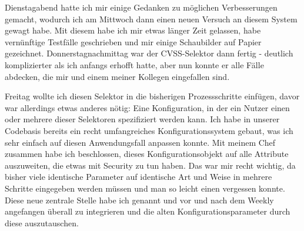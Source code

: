\sweekdaymarginpar{\weekdayWednesdayShort, \weekdayThursdayShort}

Dienstagabend hatte ich mir einige Gedanken zu möglichen Verbesserungen gemacht, wodurch ich am Mittwoch dann einen neuen Versuch an diesem System gewagt habe.
Mit diesem habe ich mir etwas länger Zeit gelassen, habe vernünftige Testfälle geschrieben und mir einige Schaubilder auf Papier gezeichnet.
Donnerstagnachmittag war der CVSS-Selektor dann fertig - deutlich komplizierter als ich anfangs erhofft hatte, aber nun konnte er alle Fälle abdecken, die mir und einem meiner Kollegen eingefallen sind.

\sweekdaymarginpar{\weekdayFridayLong}

Freitag wollte ich diesen Selektor in die bisherigen Prozessschritte einfügen, davor war allerdings etwas anderes nötig:
Eine Konfiguration, in der ein Nutzer einen oder mehrere dieser Selektoren spezifiziert werden kann.
Ich habe in unserer Codebasis bereits ein recht umfangreiches Konfigurationssystem gebaut, was ich sehr einfach auf diesen Anwendungsfall anpassen konnte.
Mit meinem Chef zusammen habe ich beschlossen, dieses Konfigurationsobjekt auf alle Attribute auszuweiten, die etwas mit Security zu tun haben.
Das war mir recht wichtig, da bisher viele identische Parameter auf identische Art und Weise in mehrere Schritte eingegeben werden müssen und man so leicht einen vergessen konnte.
Diese neue zentrale Stelle habe ich  genannt und vor und nach dem Weekly angefangen überall zu integrieren und die alten Konfigurationsparameter durch diese auszutauschen.
